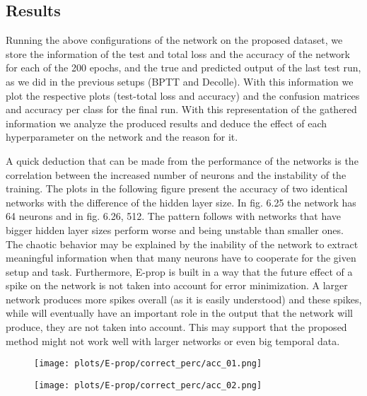 \documentclass[12pt]{report}
\begin{document}
\subsection{Results}

Running the above configurations of the network on the proposed dataset, we store the information of the test and total loss and the accuracy of the network for each of the 200 epochs, and the true and predicted output of the last test run, as we did in the previous setups (BPTT and Decolle). With this information we plot the respective plots (test-total loss and accuracy) and the confusion matrices and accuracy per class for the final run. With this representation of the gathered information we analyze the produced results and deduce the effect of each hyperparameter on the network and the reason for it.

A quick deduction that can be made from the performance of the networks is the correlation between the increased number of neurons and the instability of the training. The plots in the following figure present the accuracy of two identical networks with the difference of the hidden layer size. In fig. 6.25 the network has 64 neurons and in fig. 6.26, 512. The pattern follows with networks that have bigger hidden layer sizes perform worse and being unstable than smaller ones. The chaotic behavior may be explained by the inability of the network to extract meaningful information when that many neurons have to cooperate for the given setup and task. Furthermore, E-prop is built in a way that the future effect of a spike on the network is not taken into account for error minimization. A larger network produces more spikes overall (as it is easily understood) and these spikes, while will eventually have an important role in the output that the network will produce, they are not taken into account. This may support that the proposed method might not work well with larger networks or even big temporal data.

\begin{figure}
\centering
\begin{minipage}{.4\textwidth}
  \centering
  \texttt{[image: plots/E-prop/correct\_perc/acc\_01.png]}
  \label{fig:test1}
\end{minipage}
\begin{minipage}{.4\textwidth}
  \centering
  \texttt{[image: plots/E-prop/correct\_perc/acc\_02.png]}
  \label{fig:test2}
\end{minipage}
\end{figure}
\end{document}
